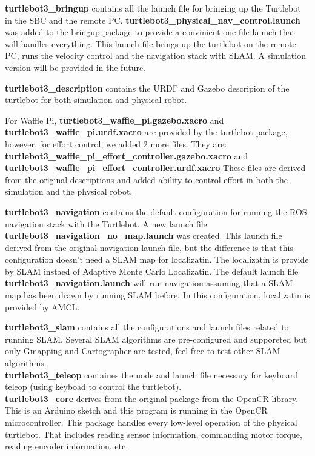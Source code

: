 \documentclass[12]{article}
\begin{document}
\textbf{turtlebot3\_bringup} contains all the launch file for bringing up the Turtlebot in the SBC and the remote PC. 
\textbf{turtlebot3\_physical\_nav\_control.launch} was added to the bringup package to provide a convinient one-file launch that will handles everything. 
This launch file brings up the turtlebot on the remote PC, runs the velocity control and the navigation stack with SLAM. A simulation version will be provided in the future.

\textbf{turtlebot3\_description} contains the URDF and Gazebo descripion of the turtlebot for both simulation and physical robot. 

For Waffle Pi, \textbf{turtlebot3\_waffle\_pi.gazebo.xacro}
and \textbf{turtlebot3\_waffle\_pi.urdf.xacro}
are provided by the turtlebot package, however, for effort control, we added 2 more files. 
They are: \\
\textbf{turtlebot3\_waffle\_pi\_effort\_controller.gazebo.xacro}
and \textbf{turtlebot3\_waffle\_pi\_effort\_controller.urdf.xacro}
These files are derived from the original descriptions and added ability to control effort in both the simulation and the physical robot. 

\textbf{turtlebot3\_navigation} contains the default configuration for running the ROS navigation stack with the Turtlebot.
A new launch file \textbf{turtlebot3\_navigation\_no\_map.launch} was created. This launch file derived from the original navigation launch file, but the difference is that this configuration doesn't need a SLAM map for localizatin. 
The localizatin is provide by SLAM instaed of Adaptive Monte Carlo Localizatin. The default launch file \textbf{turtlebot3\_navigation.launch} will run navigation assuming that a SLAM map has been drawn by running SLAM before. In this configuration, 
localizatin is provided by AMCL. 

\textbf{turtlebot3\_slam} contains all the configurations and launch files related to running SLAM. 
Several SLAM algorithms are pre-configured and supporeted but only Gmapping and Cartographer are tested, feel free to test other SLAM algorithms. \\
\textbf{turtlebot3\_teleop} containes the node and launch file necessary for keyboard teleop (using keyboad to control the turtlebot). \\
\textbf{turtlebot3\_core} derives from the original package from the OpenCR library. This is an Arduino sketch and this program is running in the OpenCR microcontroller. This package handles every low-level operation of the physical turtlebot.
That includes reading sensor information, commanding motor torque, reading encoder information, etc. \\
\end{document}
